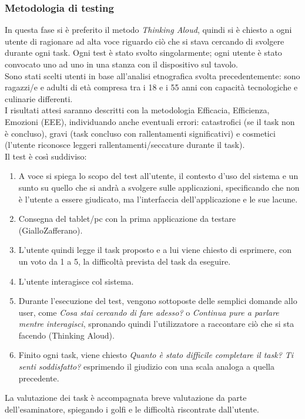 \subsubsection*{Metodologia di testing}
In questa fase si è preferito il metodo \textit{Thinking Aloud}, quindi si è chiesto a ogni utente di ragionare ad alta voce riguardo ciò che si stava cercando di svolgere durante ogni task.
Ogni test è stato svolto singolarmente; ogni utente è stato convocato uno ad uno in una stanza con il dispositivo sul tavolo.\\
Sono stati scelti utenti in base all'analisi etnografica svolta precedentemente: sono ragazzi/e e adulti di età compresa tra i 18 e i 55 anni con capacità tecnologiche e culinarie differenti.\\
I risultati attesi saranno descritti con la metodologia Efficacia, Efficienza, Emozioni (EEE), individuando anche eventuali errori: catastrofici (se il task non è concluso), gravi (task concluso con rallentamenti significativi) e cosmetici (l'utente riconosce leggeri rallentamenti/seccature durante il task).\\
Il test è così suddiviso:
\begin{enumerate}
\item A voce si spiega lo scopo del test all'utente, il contesto d'uso del sistema e un sunto su quello che si andrà a svolgere sulle applicazioni, specificando che non è l'utente a essere giudicato, ma l'interfaccia dell'applicazione e le sue lacune.
\item Consegna del tablet/pc con la prima applicazione da testare (GialloZafferano).
\item L'utente quindi legge il task proposto e a lui viene chiesto di esprimere, con un voto da 1 a 5, la difficoltà prevista del task da eseguire.
\item L'utente interagisce col sistema.
\item Durante l’esecuzione del test, vengono sottoposte delle semplici domande allo user, come \textit{Cosa stai cercando di fare adesso?} o \textit{Continua pure a parlare mentre interagisci}, spronando quindi l'utilizzatore a raccontare ciò che si sta facendo (Thinking Aloud).
\item Finito ogni task, viene chiesto \textit{Quanto è stato difficile completare il task? Ti senti soddisfatto?} esprimendo il giudizio con una scala analoga a quella precedente.
\end{enumerate}
La valutazione dei task è accompagnata breve valutazione da parte dell’esaminatore, spiegando i
golfi e le difficoltà riscontrate dall’utente.

